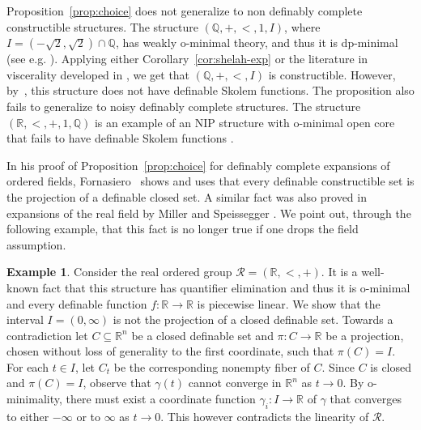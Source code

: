\documentclass[12pt]{article}
\newcommand{\Rr}{\mathcal{R}}
\newcommand{\R}{\mathbb{R}}
\newcommand{\Q}{\mathbb{Q}}
\newcommand{\NIP}{\ensuremath{\mathrm{NIP}}}
\theoremstyle{definition}
\newtheorem{example}[theorem]{Example}
\theoremstyle{remark}
\begin{document}
Proposition~\ref{prop:choice} does not generalize to non definably complete constructible structures. The structure $(\Q, +, <, 1, I)$, where $I=(-\sqrt{2}, \sqrt{2})\cap \Q$, has weakly o-minimal theory, and thus it is dp-minimal (see e.g. \cite{simon:guide-NIP}). Applying either Corollary~\ref{cor:shelah-exp} or the literature in viscerality developed in \cite{sim-wals19}, we get that $(\Q, +, <, I)$ is constructible. However, by~\cite{EHK-choice}, this structure does not have definable Skolem functions. 
The proposition also fails to generalize to noisy definably complete structures. The structure $(\R,<,+,1,\Q)$ is an example of an $\NIP$ structure with o-minimal open core that fails to have definable Skolem functions \cite[5.4.]{DMS10}. 

In his proof of Proposition~\ref{prop:choice} for definably complete expansions of ordered fields, Fornasiero~\cite{for21} shows and uses that every definable constructible set is the projection of a definable closed set. A similar fact was also proved in expansions of the real field by Miller and Speissegger \cite[page 202]{MS99}. We point out, through the following example, that this fact is no longer true if one drops the field assumption.  

\begin{example}
 Consider the real ordered group $\Rr=(\R,<,+)$. It is a well-known fact that this structure has quantifier elimination and thus it is o-minimal and every definable function $f:\R\rightarrow \R$ is piecewise linear. We show that the interval $I=(0,\infty)$ is not the projection of a closed definable set. Towards a contradiction let $C\subseteq \R^n$ be a closed definable set and $\pi:C\rightarrow \R$ be a projection, chosen without loss of generality to the first coordinate, such that $\pi(C)=I$. For each $t\in I$, let $C_t$ be the corresponding nonempty fiber of $C$. Since $C$ is closed and $\pi(C)=I$, observe that $\gamma(t)$ cannot converge in $\R^n$ as $t\rightarrow 0$. By o-minimality, there must exist a coordinate function $\gamma_i:I\rightarrow \R$ of $\gamma$ that converges to either $-\infty$ or to $\infty$ as $t\rightarrow 0$. This however contradicts the linearity of $\Rr$.    
\end{example}
\end{document}
